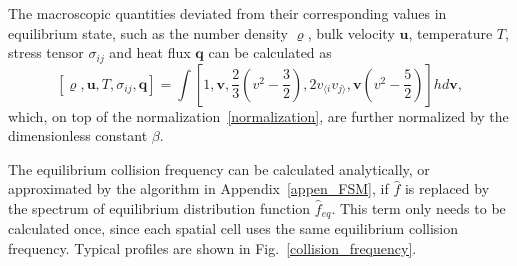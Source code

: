 %







The macroscopic quantities deviated from their corresponding values in equilibrium state, such as the number density $\varrho$, bulk velocity $\bm{u}$, temperature $T$, stress tensor $\sigma_{ij}$ and heat flux $\bm{q}$ can be calculated as
\begin{equation}\label{MP}
[\varrho,\bm{u},T,\sigma_{ij},\bm{q}]=
\int\left[1,\bm{v},\frac{2}{3}\left(v^2-\frac{3}{2}\right),2v_{\langle i}v_{j\rangle},\bm{v}\left({v^2}-\frac{5}{2}\right)\right]{h}d\bm{v},
\end{equation}
which, on top of the normalization~\eqref{normalization}, are further normalized by the dimensionless constant $\beta$.


The equilibrium collision frequency can be calculated analytically, or approximated by the algorithm in Appendix~\ref{appen_FSM}, if $\hat{f}$ is replaced by the spectrum of  equilibrium distribution function $\hat{f}_{eq}$. This term only needs to be calculated once, since each spatial cell uses the same equilibrium collision frequency. Typical profiles are shown in Fig.~\ref{collision_frequency}.


